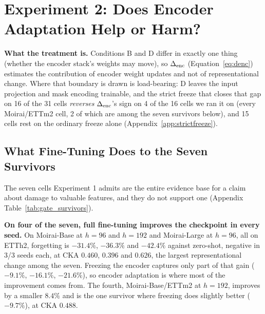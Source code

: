 \section{Experiment 2: Does Encoder Adaptation Help or Harm?}
\label{sec:exp2}

\textbf{What the treatment is.}  Conditions B and D differ in exactly one
thing (whether the encoder stack's weights may move), so $\Delta_\text{enc}$
(Equation~\ref{eq:denc}) estimates the contribution of encoder weight updates and
not of representational change.  Where that boundary is drawn is load-bearing:
D leaves the input projection and mask encoding trainable, and the strict freeze
that closes that gap on 16 of the 31 cells \emph{reverses} $\Delta_\text{enc}$'s sign on 4 of
the 16 cells we ran it on (every Moirai/ETTm2 cell, 2 of which are among the
seven survivors below), and 15 cells rest on the ordinary freeze alone
(Appendix~\ref{app:strictfreeze}).

\subsection{What Fine-Tuning Does to the Seven Survivors}
\label{sec:forecasting:results}

The seven cells Experiment 1 admits are the entire evidence base for a claim
about damage to valuable features, and they do not support one (Appendix
Table~\ref{tab:gate_survivors}).

\textbf{On four of the seven, full fine-tuning improves the checkpoint in every
seed.} On
Moirai-Base at $h{=}96$ and $h{=}192$ and Moirai-Large at $h{=}96$, all on ETTh2,
forgetting is $-31.4\%$, $-36.3\%$ and $-42.4\%$ against zero-shot, negative
in 3/3 seeds each, at CKA $0.460$, $0.396$ and $0.626$, the largest
representational change among the seven.  Freezing the encoder captures only part of that gain
($-9.1\%$, $-16.1\%$, $-21.6\%$), so encoder adaptation is where most of the
improvement comes from.  The fourth, Moirai-Base/ETTm2 at $h{=}192$, improves by a
smaller $8.4\%$ and is the one survivor where freezing does slightly better
($-9.7\%$), at CKA $0.488$.

